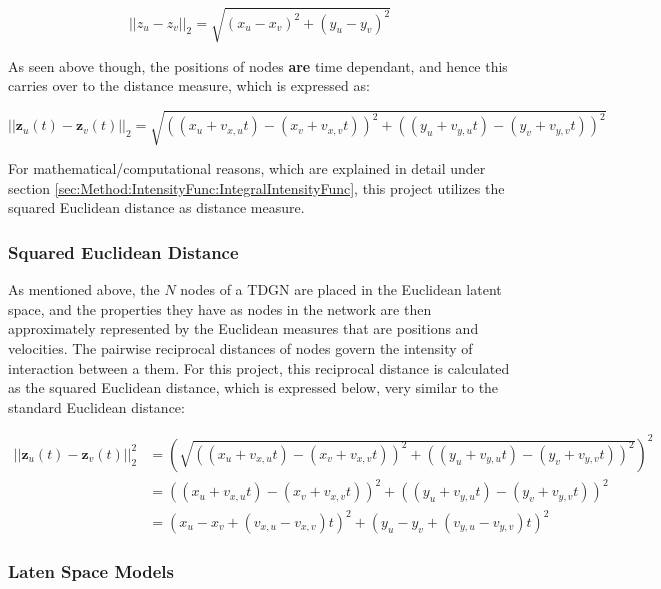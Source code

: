 \begin{equation}
    ||z_u - z_v||_2
    = 
    \sqrt{(x_u - x_v)^2 + (y_u - y_v)^2}
\end{equation}

As seen above though, the positions of nodes \textbf{are} time dependant, and hence this carries over to the distance measure, which is expressed as:

\begin{equation}
    ||\textbf{z}_u(t) - \textbf{z}_v(t)||_2
    = 
    \sqrt{((x_u + v_{x,u}t) - (x_v + v_{x,v}t))^2 + ((y_u + v_{y,u}t) - (y_v + v_{y,v}t))^2}
\end{equation}

For mathematical/computational reasons, which are explained in detail under section \ref{sec:Method:IntensityFunc:IntegralIntensityFunc}, this project utilizes the squared Euclidean distance as distance measure.


\subsubsection{Squared Euclidean Distance}
\label{sec:Method:LSM:SquaredEuclideanDistance}

As mentioned above, the $N$ nodes of a TDGN are placed in the Euclidean latent space, and the properties they have as nodes in the network are then approximately represented by the Euclidean measures that are positions and velocities.
The pairwise reciprocal distances of nodes govern the intensity of interaction between a them.
For this project, this reciprocal distance is calculated as the squared Euclidean distance, which is expressed below, very similar to the standard Euclidean distance:

\begin{align} 
||\textbf{z}_u(t) - \textbf{z}_v(t)||_2^2
&= 
\left(\sqrt{((x_u + v_{x,u}t) - (x_v + v_{x,v}t))^2 + ((y_u + v_{y,u}t) - (y_v + v_{y,v}t))^2}\right)^2
\\
&=
((x_u + v_{x,u}t) - (x_v + v_{x,v}t))^2 + ((y_u + v_{y,u}t) - (y_v + v_{y,v}t))^2
\\
&=
(x_u - x_v + (v_{x,u} - v_{x,v})t)^2 + (y_u - y_v + ( v_{y,u} - v_{y,v})t)^2
\label{eq:SquaredEuclideanDistance}
\end{align}



\subsubsection{Laten Space Models}
\label{sec:Method:LSM:}